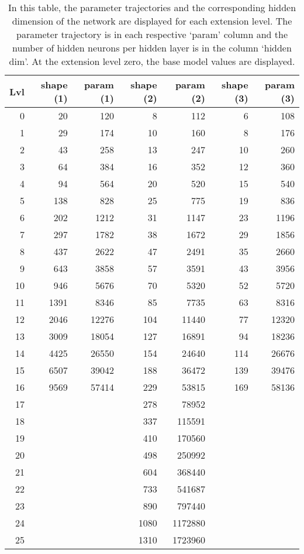 \begin{table}[ht]
    {
    \sffamily
    \caption[Parameter Trajectories of different network sizes]{
    In this table, the parameter trajectories and the corresponding hidden dimension of the network are displayed for each extension level. 
    The parameter trajectory is in each respective `param' column and the number of hidden neurons per hidden layer is in the column `hidden dim'.
    At the extension level zero, the base model values are displayed.
    }\label{tab:trajectory}
    \begin{tabular}{rrrrrrr}
    \toprule
    Lvl & shape (1) & param (1) & shape (2) & param (2) & shape (3) & param (3) \\
    \midrule
    0 & 20 & 120 & 8 & 112 & 6 & 108 \\
    1 & 29 & 174 & 10 & 160 & 8 & 176 \\
    2 & 43 & 258 & 13 & 247 & 10 & 260 \\
    3 & 64 & 384 & 16 & 352 & 12 & 360 \\
    4 & 94 & 564 & 20 & 520 & 15 & 540 \\
    5 & 138 & 828 & 25 & 775 & 19 & 836 \\
    6 & 202 & 1212 & 31 & 1147 & 23 & 1196 \\
    7 & 297 & 1782 & 38 & 1672 & 29 & 1856 \\
    8 & 437 & 2622 & 47 & 2491 & 35 & 2660 \\
    9 & 643 & 3858 & 57 & 3591 & 43 & 3956 \\
    10 & 946 & 5676 & 70 & 5320 & 52 & 5720 \\
    11 & 1391 & 8346 & 85 & 7735 & 63 & 8316 \\
    12 & 2046 & 12276 & 104 & 11440 & 77 & 12320 \\
    13 & 3009 & 18054 & 127 & 16891 & 94 & 18236 \\
    14 & 4425 & 26550 & 154 & 24640 & 114 & 26676 \\
    15 & 6507 & 39042 & 188 & 36472 & 139 & 39476 \\
    16 & 9569 & 57414 & 229 & 53815 & 169 & 58136 \\
    17 &   &   & 278 & 78952 &   &   \\
    18 &   &   & 337 & 115591 &   &   \\
    19 &   &   & 410 & 170560 &   &   \\
    20 &   &   & 498 & 250992 &   &   \\
    21 &   &   & 604 & 368440 &   &   \\
    22 &   &   & 733 & 541687 &   &   \\
    23 &   &   & 890 & 797440 &   &   \\
    24 &   &   & 1080 & 1172880 &   &   \\
    25 &   &   & 1310 & 1723960 &   &   \\
    \bottomrule
    \end{tabular}
    }
\end{table}

